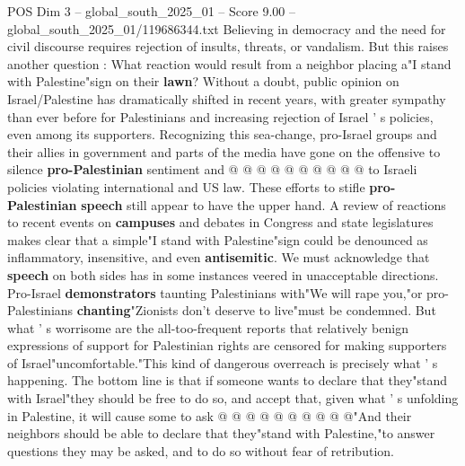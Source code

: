 \begin{textsample}{POS Dim 3 – global\_south\_2025\_01 – Score 9.00 – global\_south\_2025\_01/119686344.txt}
Believing in democracy and the need for civil discourse requires rejection of insults, threats, or vandalism.
But this raises another question : What reaction would result from a neighbor placing a"I stand with Palestine"sign on their \textbf{lawn}?
Without a doubt, public opinion on Israel/Palestine has dramatically shifted in recent years, with greater sympathy than ever before for Palestinians and increasing rejection of Israel ' s policies, even among its supporters.
Recognizing this sea-change, pro-Israel groups and their allies in government and parts of the media have gone on the offensive to silence \textbf{pro-Palestinian} sentiment and @ @ @ @ @ @ @ @ @ @ to Israeli policies violating international and US law.
These efforts to stifle \textbf{pro-Palestinian} \textbf{speech} still appear to have the upper hand.
A review of reactions to recent events on \textbf{campuses} and debates in Congress and state legislatures makes clear that a simple"I stand with Palestine"sign could be denounced as inflammatory, insensitive, and even \textbf{antisemitic}.
We must acknowledge that \textbf{speech} on both sides has in some instances veered in unacceptable directions.
Pro-Israel \textbf{demonstrators} taunting Palestinians with"We will rape you,"or pro-Palestinians \textbf{chanting}"Zionists don't deserve to live"must be condemned.
But what ' s worrisome are the all-too-frequent reports that relatively benign expressions of support for Palestinian rights are censored for making supporters of Israel"uncomfortable."This kind of dangerous overreach is precisely what ' s happening.
The bottom line is that if someone wants to declare that they"stand with Israel"they should be free to do so, and accept that, given what ' s unfolding in Palestine, it will cause some to ask @ @ @ @ @ @ @ @ @ @"And their neighbors should be able to declare that they"stand with Palestine,"to answer questions they may be asked, and to do so without fear of retribution.

\end{textsample}
